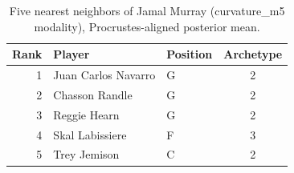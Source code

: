 \begin{table}[htbp]
  \centering\small
  \begin{tabular}{rllc}
    \toprule
    Rank & Player & Position & Archetype \\
    \midrule
    1 & Juan Carlos Navarro & G & 2 \\
    2 & Chasson Randle & G & 2 \\
    3 & Reggie Hearn & G & 2 \\
    4 & Skal Labissiere & F & 3 \\
    5 & Trey Jemison & C & 2 \\
    \bottomrule
  \end{tabular}
  \caption{Five nearest neighbors of Jamal Murray (curvature_m5 modality), Procrustes-aligned posterior mean.}
  \label{tab:Jamal_Murray_neighbors_curvature_m5}
\end{table}

